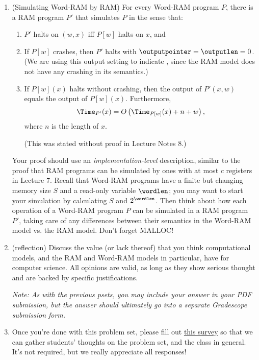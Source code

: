 \documentclass[11pt]{article}
\begin{document}
\begin{enumerate}
\item (Simulating Word-RAM by RAM) For every Word-RAM program $P$, there is a RAM program $P'$ that simulates $P$ in the sense that:
\begin{enumerate}
    \item $P'$ halts on $(w,x)$ iff $P[w]$ halts on $x$, and 
    \item If $P[w]$ crashes, then $P'$ halts with $\outputpointer=\outputlen=0$. (We are using this output setting to indicate \crash, since the RAM model does not have any crashing in its semantics.)
    \item If $P[w](x)$ halts without crashing, then the output of $P'(x,w)$ equals the output of $P[w](x)$.
     Furthermore,   
       $$\Time_{P'}(x) = O\left(\Time_{P[w]}(x)+n+w\right),$$
where $n$ is the length of $x$.

(This was stated without proof in Lecture Notes 8.) 

\end{enumerate}

Your proof should use an {\em implementation-level} description, similar to the proof that RAM programs can be simulated by ones with at most $c$ registers in Lecture 7.  Recall that Word-RAM programs have a finite but changing memory size $S$ and a read-only variable $\wordlen$; you may want to start your simulation by calculating $S$ and $2^{\wordlen}$.  Then think about how each operation of a Word-RAM program $P$ can be simulated in a RAM program $P'$, taking care of any differences between their semantics in the Word-RAM model vs. the RAM model. Don't forget MALLOC!

\item (reflection) Discuss the value (or lack thereof) that you think computational models, and the RAM and Word-RAM models in particular, have for computer science.  All opinions are valid, as long as they show serious thought and are backed by specific justifications.

\textit{Note: As with the previous psets, you may include your answer in your PDF submission, but the answer should ultimately go into a separate Gradescope submission form.}

\item Once you're done with this problem set, please fill out \href{https://forms.gle/TG8cG4LWN3S4T6za6}{this survey} so that we can gather students' thoughts on the problem set, and the class in general. It's not required, but we really appreciate all responses!

\end{enumerate}
\end{document}
